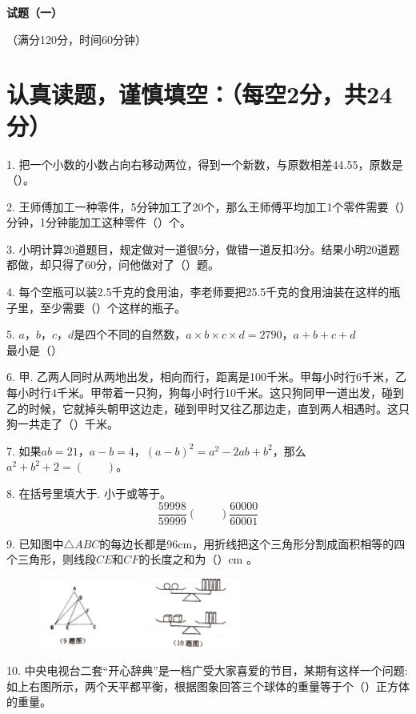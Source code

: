 \documentclass{../source/Paper}
\date{\today}
\begin{document}
\begin{center}
    \huge
    \bfseries
    试题（一）

    \large
    \songti
    \mdseries
    （满分120分，时间60分钟）
\end{center}
\section{认真读题，谨慎填空：（每空2分，共24分）}

1. 把一个小数的小数占向右移动两位，得到一个新数，与原数相差44.55，原数是（\qquad）。

2. 王师傅加工一种零件，5分钟加工了20个，那么王师傅平均加工1个零件需要（\qquad）分钟，1分钟能加工这种零件（\qquad）个。

3. 小明计算20道题目，规定做对一道很5分，做错一道反扣3分。结果小明20道题都做，却只得了60分，问他做对了（\qquad）题。

4. 每个空瓶可以装2.5千克的食用油，李老师要把25.5千克的食用油装在这样的瓶子里，至少需要（\qquad）个这样的瓶子。

5. $a， b， c， d$是四个不同的自然数，$a\times b\times c\times d=2790$，$a+b+c+d$最小是（\qquad）

6. 甲. 乙两人同时从两地出发，相向而行，距离是100千米。甲每小时行6千米，乙每小时行4千米。甲带着一只狗，狗每小时行10千米。这只狗同甲一道出发，碰到乙的时候，它就掉头朝甲这边走，碰到甲时又往乙那边走，直到两人相遇时。这只狗一共走了（\qquad）千米。

7. 如果$ab=21，a-b=4， (a-b)^2=a^2 - 2ab+b^2$，那么$a^2+b^2+2=(\qquad)$。


8. 在括号里填大于. 小于或等于。$$\displaystyle \frac{59998}{59999}(\qquad)\frac{60000}{60001}$$


9. 已知图中$\bigtriangleup ABC$的每边长都是96cm，用折线把这个三角形分割成面积相等的四个三角形，则线段$CE$和$CF$的长度之和为（\qquad）cm 。
\begin{figure}[H]
    \centering
    \includegraphics[width = 0.6\textwidth]{pic/1.9.png}
\end{figure}

10. 中央电视台二套“开心辞典”是一档广受大家喜爱的节目，某期有这样一个问题:如上右图所示，两个天平都平衡，根据图象回答三个球体的重量等于个（\qquad）正方体的重量。
\end{document}
